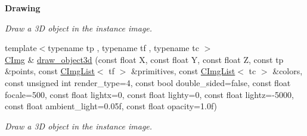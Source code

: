 \begin{Indent}{\bf Drawing}
\begin{DoxyCompactItemize}
\begin{DoxyCompactList}\small\item\em Draw a 3\-D object in the instance image. \end{DoxyCompactList}\item 
\hypertarget{structcimg__library_1_1_c_img_a0d7784579bc4b87790a5acbb23f130b4}{{\footnotesize template$<$typename tp , typename tf , typename tc $>$ }\\\hyperlink{structcimg__library_1_1_c_img}{C\-Img} \& \hyperlink{structcimg__library_1_1_c_img_a0d7784579bc4b87790a5acbb23f130b4}{draw\-\_\-object3d} (const float X, const float Y, const float Z, const tp \&points, const \hyperlink{structcimg__library_1_1_c_img_list}{C\-Img\-List}$<$ tf $>$ \&primitives, const \hyperlink{structcimg__library_1_1_c_img_list}{C\-Img\-List}$<$ tc $>$ \&colors, const unsigned int render\-\_\-type=4, const bool double\-\_\-sided=false, const float focale=500, const float lightx=0, const float lighty=0, const float lightz=-\/5000, const float ambient\-\_\-light=0.\-05f, const float opacity=1.\-0f)}\label{structcimg__library_1_1_c_img_a0d7784579bc4b87790a5acbb23f130b4}

\begin{DoxyCompactList}\small\item\em Draw a 3\-D object in the instance image. \end{DoxyCompactList}\end{DoxyCompactItemize}
\end{Indent}
